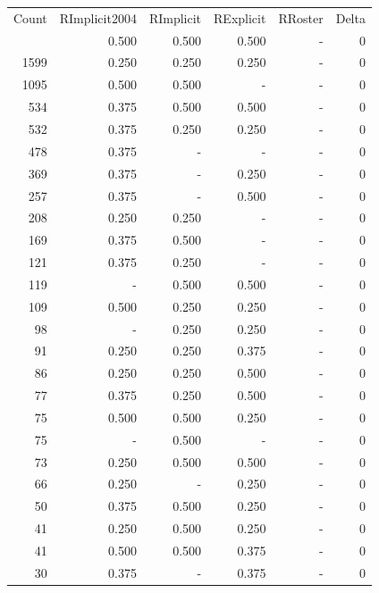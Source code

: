 \documentclass[a4paper]{article}\usepackage{graphicx, color}
\begin{document}
\begin{table}[ht]
\centering
\begin{tabular}{rrrrrr}
  \hline
Count & RImplicit2004 & RImplicit & RExplicit & RRoster & Delta \\ 
  \rowcolor{goodColor}  \hline
4406 & 0.500 & 0.500 & 0.500 & - & 0 \\ 
   \rowcolor{goodColor} 1599 & 0.250 & 0.250 & 0.250 & - & 0 \\ 
  1095 & 0.500 & 0.500 & - & - & 0 \\ 
   \rowcolor{goodColor} 534 & 0.375 & 0.500 & 0.500 & - & 0 \\ 
   \rowcolor{goodColor} 532 & 0.375 & 0.250 & 0.250 & - & 0 \\ 
   \rowcolor{nullColor} 478 & 0.375 & - & - & - & 0 \\ 
   \rowcolor{sosoColor} 369 & 0.375 & - & 0.250 & - & 0 \\ 
   \rowcolor{sosoColor} 257 & 0.375 & - & 0.500 & - & 0 \\ 
  208 & 0.250 & 0.250 & - & - & 0 \\ 
  169 & 0.375 & 0.500 & - & - & 0 \\ 
  121 & 0.375 & 0.250 & - & - & 0 \\ 
   \rowcolor{goodColor} 119 & - & 0.500 & 0.500 & - & 0 \\ 
   \rowcolor{goodColor} 109 & 0.500 & 0.250 & 0.250 & - & 0 \\ 
   \rowcolor{goodColor} 98 & - & 0.250 & 0.250 & - & 0 \\ 
  91 & 0.250 & 0.250 & 0.375 & - & 0 \\ 
   \rowcolor{badColor} 86 & 0.250 & 0.250 & 0.500 & - & 0 \\ 
   \rowcolor{badColor} 77 & 0.375 & 0.250 & 0.500 & - & 0 \\ 
   \rowcolor{badColor} 75 & 0.500 & 0.500 & 0.250 & - & 0 \\ 
  75 & - & 0.500 & - & - & 0 \\ 
   \rowcolor{goodColor} 73 & 0.250 & 0.500 & 0.500 & - & 0 \\ 
   \rowcolor{sosoColor} 66 & 0.250 & - & 0.250 & - & 0 \\ 
   \rowcolor{badColor} 50 & 0.375 & 0.500 & 0.250 & - & 0 \\ 
   \rowcolor{badColor} 41 & 0.250 & 0.500 & 0.250 & - & 0 \\ 
  41 & 0.500 & 0.500 & 0.375 & - & 0 \\ 
   \rowcolor{sosoColor} 30 & 0.375 & - & 0.375 & - & 0 \\ 

\end{tabular}
\end{table}
\end{document}
